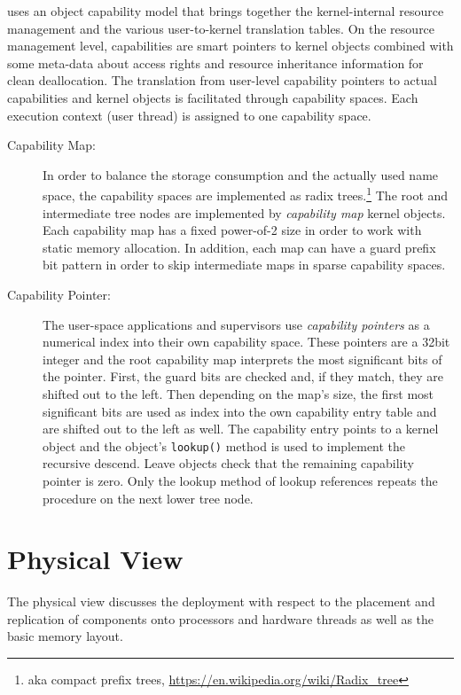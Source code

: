 \mythos uses an object capability model that brings together the kernel-internal resource management and the various user-to-kernel translation tables. On the resource management level, capabilities are smart pointers to kernel objects combined with some meta-data about access rights and resource inheritance information for clean deallocation. The translation from user-level capability pointers to actual capabilities and kernel objects is facilitated through capability spaces. Each execution context (user thread) is assigned to one capability space. 

\begin{description}
\item[Capability Map:] In order to balance the storage consumption and the actually used name space, the capability spaces are implemented as radix trees.\footnote{aka compact prefix trees, \url{https://en.wikipedia.org/wiki/Radix_tree}} The root and intermediate tree nodes are implemented by \emph{capability map} kernel objects. 
Each capability map has a fixed power-of-2 size in order to work with static memory allocation. In addition, each map can have a guard prefix bit pattern in order to skip intermediate maps in sparse capability spaces.

\item[Capability Pointer:] The user-space applications and supervisors use \emph{capability pointers} as a numerical index into their own capability space. These pointers are a 32bit integer and the root capability map interprets the most significant bits of the pointer. First, the guard bits are checked and, if they match, they are shifted out to the left. Then depending on the map's size, the first most significant bits are used as index into the own capability entry table and are shifted out to the left as well. The capability entry points to a kernel object and the object's \texttt{lookup()} method is used to implement the recursive descend. Leave objects check that the remaining capability pointer is zero. Only the lookup method of lookup references repeats the procedure on the next lower tree node.  
\end{description}

\section{Physical View}
\label{sec:global-physical-view}

The physical view discusses the deployment with respect to the placement and replication of components onto processors and hardware threads as well as the basic memory layout.

